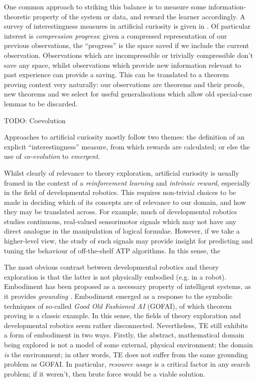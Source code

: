 \documentclass[]{article}
\begin{document}
One common approach to striking this balance is to measure some information-theoretic property of the system or data, and reward the learner accordingly. A survey of interestingness measures in artificial curiosity is given in \cite{oudeyer2007intrinsic}. Of particular interest is \emph{compression progress}: given a compressed representation of our previous observations, the ``progress'' is the space saved if we include the current observation. Observations which are incompressible or trivially compressible don't save any space, whilst observations which provide new information relevant to past experience can provide a saving. This can be translated to a theorem proving context very naturally: our observations are theorems and their proofs, new theorems and we select for useful generalisations which allow old special-case lemmas to be discarded.

TODO: Coevolution

Approaches to artificial curiosity mostly follow two themes: the definition of an explicit ``interestingness'' measure, from which rewards are calculated; or else the use of \emph{co-evolution} to \emph{emergent}.

Whilst clearly of relevance to theory exploration, artificial curiosity is usually framed in the context of a \emph{reinforcement learning} and \emph{intrinsic reward}, especially in the field of developmental robotics. This requires non-trivial choices to be made in deciding which of its concepts are of relevance to our domain, and how they may be translated across. For example, much of developmental robotics studies continuous, real-valued sensorimotor signals which may not have any direct analogue in the manipulation of logical formulae. However, if we take a higher-level view, the study of such signals may provide insight for predicting and tuning the behaviour of off-the-shelf ATP algorithms. In this sense, the

The most obvious contrast between developmental robotics and theory exploration is that the latter is not physically embodied (e.g. in a robot). Embodiment has been proposed as a necessary property of intelligent systems, as it provides \emph{grounding} \cite{anderson2003embodied}. Embodiment emerged as a response to the symbolic techniques of so-called \emph{Good Old Fashioned AI} (GOFAI), of which theorem proving is a classic example. In this sense, the fields of theory exploration and developmental robotics seem rather disconnected. Nevertheless, TE still exhibits a form of embodiment in two ways. Firstly, the abstract, mathematical domain being explored is not a model of some external, physical environment; the domain \emph{is} the environment; in other words, TE does not suffer from the same grounding problem as GOFAI. In particular, \emph{resource usage} is a critical factor in any search problem; if it weren't, then brute force would be a viable solution.
\end{document}
